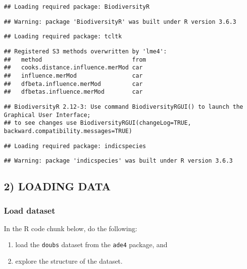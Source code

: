 \documentclass[
]{article}
\providecommand{\tightlist}{%
  \setlength{\itemsep}{0pt}\setlength{\parskip}{0pt}}
\begin{document}
\begin{verbatim}
## Loading required package: BiodiversityR
\end{verbatim}

\begin{verbatim}
## Warning: package 'BiodiversityR' was built under R version 3.6.3
\end{verbatim}

\begin{verbatim}
## Loading required package: tcltk
\end{verbatim}

\begin{verbatim}
## Registered S3 methods overwritten by 'lme4':
##   method                          from
##   cooks.distance.influence.merMod car 
##   influence.merMod                car 
##   dfbeta.influence.merMod         car 
##   dfbetas.influence.merMod        car
\end{verbatim}

\begin{verbatim}
## BiodiversityR 2.12-3: Use command BiodiversityRGUI() to launch the Graphical User Interface; 
## to see changes use BiodiversityRGUI(changeLog=TRUE, backward.compatibility.messages=TRUE)
\end{verbatim}

\begin{verbatim}
## Loading required package: indicspecies
\end{verbatim}

\begin{verbatim}
## Warning: package 'indicspecies' was built under R version 3.6.3
\end{verbatim}

\hypertarget{loading-data}{%
\subsection{2) LOADING DATA}\label{loading-data}}

\hypertarget{load-dataset}{%
\subsubsection{Load dataset}\label{load-dataset}}

In the R code chunk below, do the following:

\begin{enumerate}
\def\labelenumi{\arabic{enumi}.}
\tightlist
\item
  load the \texttt{doubs} dataset from the \texttt{ade4} package, and
\item
  explore the structure of the dataset.
\end{enumerate}
\end{document}
